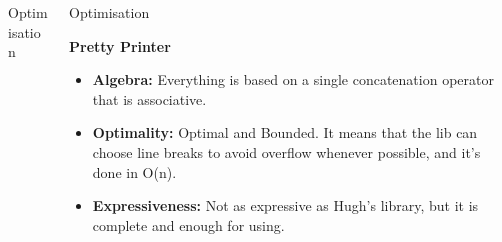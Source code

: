 \documentclass[final]{beamer}
\newlength{\onecolwid}
\newlength{\twocolwid}
\begin{document}
\begin{frame}[t]
\begin{columns}[t]
\begin{column}{\twocolwid}
\begin{columns}[t,totalwidth=\twocolwid]
\begin{column}{\onecolwid}
\begin{block}{Optimisation}
\begin{itemize}
\end{itemize}

\end{block}


\end{column} %

\begin{column}{\onecolwid} %


\begin{block}{Optimisation}



\textbf{Pretty Printer}
\begin{itemize}
\item \textbf{Algebra:} Everything is based on a single concatenation operator that is associative.
\item \textbf{Optimality:} Optimal and Bounded. It means that the lib can choose line breaks to avoid overflow whenever possible, and it's done in O(n).
\item \textbf{Expressiveness:} Not as expressive as Hugh's library, but it is complete and enough for using.

\end{itemize}





\end{block}



\end{column}
\end{columns}
\end{column}
\end{columns}
\end{frame}
\end{document}
